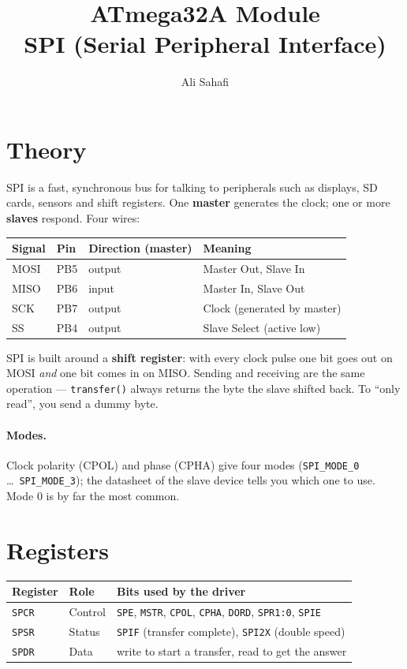 \documentclass[11pt,a4paper]{article}
\title{ATmega32A Module \\ \Large SPI (Serial Peripheral Interface)}
\author{Ali Sahafi}
\date{}
\begin{document}
\maketitle

\section{Theory}

SPI is a fast, synchronous bus for talking to peripherals such as displays,
SD cards, sensors and shift registers. One \textbf{master} generates the
clock; one or more \textbf{slaves} respond. Four wires:

\begin{center}
\begin{tabular}{llll}
\toprule
\textbf{Signal} & \textbf{Pin} & \textbf{Direction (master)} & \textbf{Meaning} \\
\midrule
MOSI & PB5 & output & Master Out, Slave In \\
MISO & PB6 & input  & Master In, Slave Out \\
SCK  & PB7 & output & Clock (generated by master) \\
SS   & PB4 & output & Slave Select (active low) \\
\bottomrule
\end{tabular}
\end{center}

SPI is built around a \textbf{shift register}: with every clock pulse one bit
goes out on MOSI \emph{and} one bit comes in on MISO. Sending and receiving
are the same operation --- \texttt{transfer()} always returns the byte the
slave shifted back. To ``only read'', you send a dummy byte.

\paragraph{Modes.} Clock polarity (CPOL) and phase (CPHA) give four modes
(\texttt{SPI\_MODE\_0} \dots\ \texttt{SPI\_MODE\_3}); the datasheet of the
slave device tells you which one to use. Mode 0 is by far the most common.

\section{Registers}

\begin{center}
\small
\begin{tabular}{lll}
\toprule
\textbf{Register} & \textbf{Role} & \textbf{Bits used by the driver} \\
\midrule
\texttt{SPCR} & Control & \texttt{SPE}, \texttt{MSTR}, \texttt{CPOL}, \texttt{CPHA}, \texttt{DORD}, \texttt{SPR1:0}, \texttt{SPIE} \\
\texttt{SPSR} & Status  & \texttt{SPIF} (transfer complete), \texttt{SPI2X} (double speed) \\
\texttt{SPDR} & Data    & write to start a transfer, read to get the answer \\
\bottomrule
\end{tabular}
\end{center}
\end{document}
